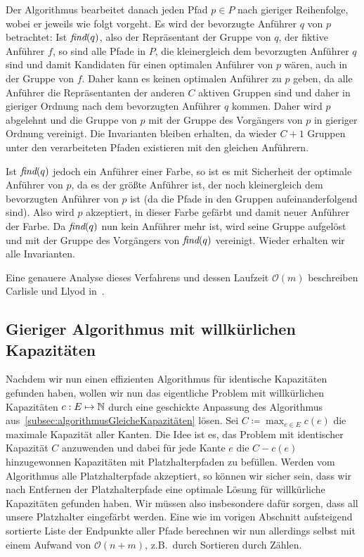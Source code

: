 Der Algorithmus bearbeitet danach jeden Pfad $p \in P$ nach gieriger Reihenfolge, wobei er jeweils wie folgt vorgeht.
Es wird der bevorzugte Anführer $q$ von $p$ betrachtet:
Ist $\text{\em find}(q)$, also der Repräsentant der Gruppe von $q$, der fiktive Anführer $f$, so sind alle Pfade in $P$, die kleinergleich dem bevorzugten Anführer $q$
sind und damit Kandidaten für einen optimalen Anführer von $p$ wären, auch in der Gruppe von $f$. Daher kann es keinen optimalen Anführer zu $p$ geben,
da alle Anführer die Repräsentanten der anderen $C$ aktiven Gruppen sind und daher in gieriger Ordnung nach dem bevorzugten Anführer $q$ kommen.
Daher wird $p$ abgelehnt und die Gruppe von $p$ mit der Gruppe des Vorgängers von $p$ in gieriger Ordnung vereinigt.
Die Invarianten bleiben erhalten, da wieder $C+1$ Gruppen unter den verarbeiteten Pfaden existieren mit den gleichen
Anführern.

Ist $\text{\em find}(q)$ jedoch ein Anführer einer Farbe, so ist es mit Sicherheit der optimale Anführer von $p$, da es der größte
Anführer ist, der noch kleinergleich dem bevorzugten Anführer von $p$ ist (da die Pfade in den Gruppen
aufeinanderfolgend sind).
Also wird $p$ akzeptiert, in dieser Farbe gefärbt und damit neuer Anführer der Farbe.
Da $\text{\em find}(q)$ nun kein Anführer mehr ist, wird seine Gruppe aufgelöst und mit der Gruppe des Vorgängers von $\text{\em find}(q)$
vereinigt.
Wieder erhalten wir alle Invarianten.

Eine genauere Analyse dieses Verfahrens und dessen Laufzeit $\mathcal O(m)$ beschreiben Carlisle und Llyod in~\cite{carlisle}.

\subsection{Gieriger Algorithmus mit willkürlichen Kapazitäten}\label{subsec:anpassenAnWillkürlicheKapazitäten}

Nachdem wir nun einen effizienten Algorithmus für identische Kapazitäten gefunden haben, wollen wir nun das eigentliche Problem mit
willkürlichen Kapazitäten $c: E \mapsto \mathbb N$ durch eine geschickte Anpassung des Algorithmus aus~\ref{subsec:algorithmusGleicheKapazitäten} lösen.
Sei $C \coloneqq \max_{e \in E} c(e)$ die maximale Kapazität aller Kanten.
Die Idee ist es, das Problem mit identischer Kapazität $C$ anzuwenden und dabei für jede Kante $e$ die $C - c(e)$
hinzugewonnen Kapazitäten mit Platzhalterpfaden zu befüllen.
Werden vom Algorithmus alle Platzhalterpfade akzeptiert, so können wir sicher sein, dass wir nach Entfernen der
Platzhalterpfade eine optimale Lösung für willkürliche Kapazitäten gefunden haben.
Wir müssen also insbesondere dafür sorgen, dass all unsere Platzhalter eingefärbt werden.
Eine wie im vorigen Abschnitt aufsteigend sortierte Liste der Endpunkte aller Pfade berechnen wir nun allerdings selbst mit einem Aufwand von $\mathcal O(n+m)$, z.B.\ durch Sortieren durch Zählen.

